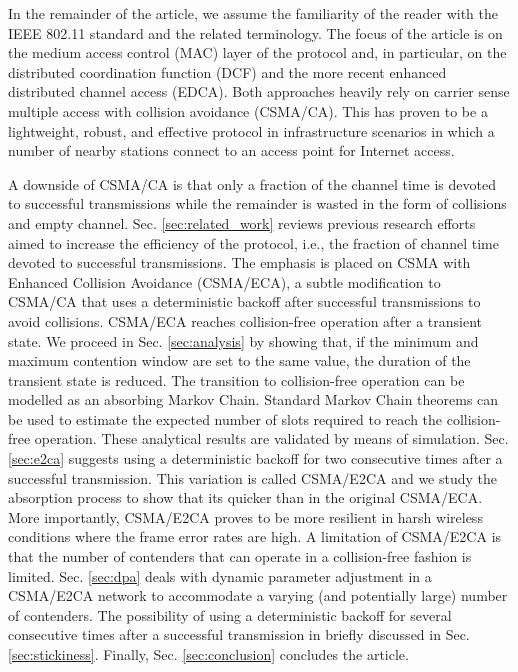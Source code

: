 \documentclass[journal]{IEEEtran}
\begin{document}
In the remainder of the article, we assume the familiarity of the reader with the IEEE 802.11 standard and the related terminology. The focus of the article is on the medium access control (MAC) layer of the protocol and, in particular, on the distributed coordination function (DCF) and the more recent enhanced distributed channel access (EDCA). Both approaches heavily rely on carrier sense multiple access with collision avoidance (CSMA/CA). This has proven to be a lightweight, robust, and effective protocol in infrastructure scenarios in which a number of nearby stations connect to an access point for Internet access.

A downside of CSMA/CA is that only a fraction of the channel time is devoted to successful transmissions while the remainder is wasted in the form of collisions and empty channel. Sec. \ref{sec:related_work} reviews previous research efforts aimed to increase the efficiency of the protocol, i.e., the fraction of channel time devoted to successful transmissions. The emphasis is placed on CSMA with Enhanced Collision Avoidance (CSMA/ECA), a subtle modification to CSMA/CA that uses a deterministic backoff after successful transmissions to avoid collisions. CSMA/ECA reaches collision-free operation after a transient state. We proceed in Sec. \ref{sec:analysis} by showing that, if the minimum and maximum contention window are set to the same value, the duration of the transient state is reduced. The transition to collision-free operation can be modelled as an absorbing Markov Chain. Standard Markov Chain theorems can be used to estimate the expected number of slots required to reach the collision-free operation. These analytical results are validated by means of simulation. Sec. \ref{sec:e2ca} suggests using a deterministic backoff for two consecutive times after a successful transmission. This variation is called CSMA/E2CA and we study the absorption process to show that its quicker than in the original CSMA/ECA. More importantly, CSMA/E2CA proves to be more resilient in harsh wireless conditions where the frame error rates are high. A limitation of CSMA/E2CA is that the number of contenders that can operate in a collision-free fashion is limited. Sec. \ref{sec:dpa} deals with dynamic parameter adjustment in a CSMA/E2CA network to accommodate a varying (and potentially large) number of contenders. The possibility of using a deterministic backoff for several consecutive times after a successful transmission in briefly discussed in Sec. \ref{sec:stickiness}. Finally, Sec. \ref{sec:conclusion} concludes the article.
\end{document}
